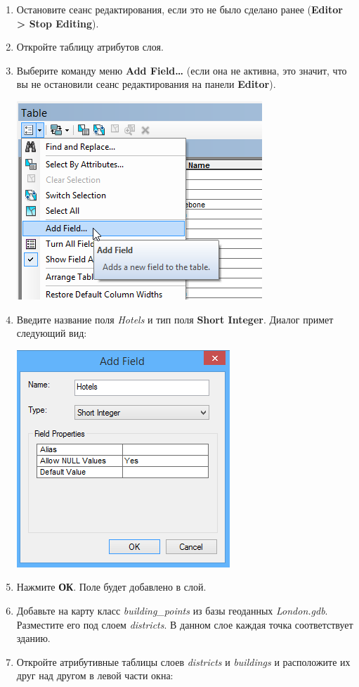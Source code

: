 \documentclass[]{book}
\theoremstyle{definition}
\theoremstyle{definition}
\theoremstyle{definition}
\theoremstyle{remark}
\begin{document}
\begin{enumerate}
\def\labelenumi{\arabic{enumi}.}
\item
  Остановите сеанс редактирования, если это не было сделано ранее
  (\textbf{Editor \textgreater{} Stop Editing}).
\item
  Откройте таблицу атрибутов слоя.
\item
  Выберите команду меню \textbf{Add Field\ldots{}} (если она не активна,
  это значит, что вы не остановили сеанс редактирования на панели
  \textbf{Editor}).

  \includegraphics{images/Ex07/image14.png}
\item
  Введите название поля \emph{Hotels} и тип поля \textbf{Short Integer}.
  Диалог примет следующий вид:

  \includegraphics{images/Ex07/image15.png}
\item
  Нажмите \textbf{ОК}. Поле будет добавлено в слой.
\item
  Добавьте на карту класс \emph{building\_points} из базы геоданных
  \emph{London.gdb}. Разместите его под слоем \emph{districts}. В данном
  слое каждая точка соответствует зданию.
\item
  Откройте атрибутивные таблицы слоев \emph{districts} и
  \emph{buildings} и расположите их друг над другом в левой части окна:


\end{enumerate}
\end{document}
